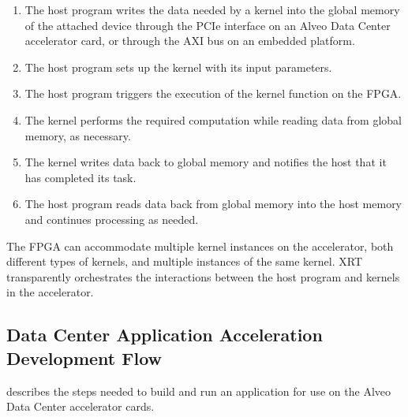 \begin{enumerate}
    \item The host program writes the data needed by a kernel into the global memory of the attached device through the PCIe interface on an Alveo Data Center accelerator card, or through the AXI bus on an embedded platform.
    \item The host program sets up the kernel with its input parameters.
    \item The host program triggers the execution of the kernel function on the FPGA.
    \item The kernel performs the required computation while reading data from global memory, as necessary.
    \item The kernel writes data back to global memory and notifies the host that it has completed its task.
    \item The host program reads data back from global memory into the host memory and continues processing as needed.
\end{enumerate}

The FPGA can accommodate multiple kernel instances on the accelerator, both different types of
kernels, and multiple instances of the same kernel. XRT transparently orchestrates the
interactions between the host program and kernels in the accelerator. 

\subsection{Data Center Application Acceleration Development Flow}
 describes the steps needed to build and run an application for use on the Alveo Data Center accelerator cards.

